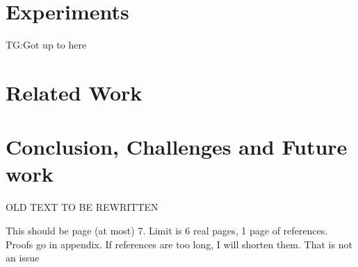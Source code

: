 \documentclass{article}
\newcommand\comment[1]{\marginpar{\parbox{\marginparwidth}{\tiny #1}}}
\renewcommand\comment[1]{#1}
\newcommand{\tias}[1]{{\comment{\color{blue}\textsc{TG:}#1}}}
\newcommand{\todo}[1]{{\comment{\color{red}\textsc{TODO:}#1} }}
\begin{document}
\section{Experiments}
\label{sec:experiments}

%  

\tias{Got up to here}
\section{Related Work}\label{sec:related}



\section{Conclusion, Challenges and Future work}\label{sec:conclusion}
{\color{OliveGreen} OLD TEXT TO BE REWRITTEN

}

\newpage
{\color{red}This should be page (at most) 7. Limit is 6 real pages, 1 page of references. Proofs go in appendix. If references are too long, I will shorten them. That is not an issue}
\newpage

{
\footnotesize

 
}
% 
\end{document}

